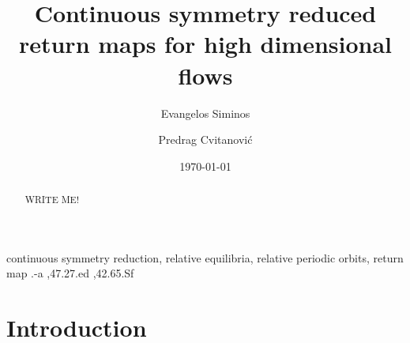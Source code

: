 \documentclass[aps,prl,preprint,superscriptaddress]{revtex4}
\begin{document}
    \ifoldMikTeX %
    \else
{}
\begin{frontmatter}
    \fi          %


			\title{
Continuous symmetry reduced return maps for high dimensional flows
			}
\author[gatech]{Evangelos Siminos}
\author[gatech]{Predrag Cvitanovi\'c}
\address[gatech]{Center for Nonlinear Science,
School of Physics, Georgia Institute of Technology,
Atlanta, GA 30332-0430}


\date{\today}

\begin{abstract}
WRITE ME!
\end{abstract}

    \ifoldMikTeX %
    \else
\begin{keyword}
continuous symmetry reduction, relative equilibria, relative periodic orbits, return map
.-a \sep 47.27.ed \sep 42.65.Sf
\end{keyword}
\end{frontmatter}
    \fi %

\section{\label{s:intro} Introduction}
    

\subsection{\label{s:introCLE} \CLe}
    
\end{document}
